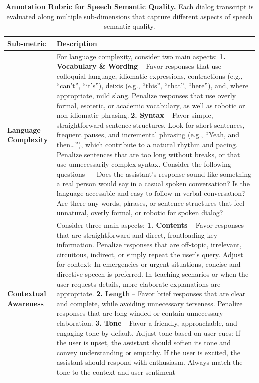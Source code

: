 \begin{table}[h]
\centering
\footnotesize
\renewcommand{\arraystretch}{1}  %
\setlength{\tabcolsep}{10pt}
\captionsetup{font=small}

\caption{\textbf{Annotation Rubric for Speech Semantic Quality.}
Each dialog transcript is evaluated along multiple sub-dimensions that capture different aspects of speech semantic quality.}
\vspace{-0.6em}

\begin{tabular}{p{4.3cm} p{11.4cm}}
\toprule
\textbf{Sub-metric} & \textbf{Description} \\
\midrule
\textbf{Language Complexity} & For language complexity, consider two main aspects: \textbf{1. Vocabulary \& Wording} -- Favor responses that use colloquial language, idiomatic expressions, contractions (e.g., “can’t”, “it’s”), deixis (e.g., “this”, “that”, “here”), and, where appropriate, mild slang. Penalize responses that use overly formal, esoteric, or academic vocabulary, as well as robotic or non-idiomatic phrasing. \textbf{2. Syntax} -- Favor simple, straightforward sentence structures. Look for short sentences, frequent pauses, and incremental phrasing (e.g., “Yeah, and then…”), which contribute to a natural rhythm and pacing. Penalize sentences that are too long without breaks, or that use unnecessarily complex syntax. Consider the following questions --- Does the assistant’s response sound like something a real person would say in a casual spoken conversation? Is the language accessible and easy to follow in verbal conversation? Are there any words, phrases, or sentence structures that feel unnatural, overly formal, or robotic for spoken dialog? \\
\textbf{Contextual Awareness} & Consider three main aspects: \textbf{1. Contents} -- Favor responses that are straightforward and direct, frontloading key information. Penalize responses that are off-topic, irrelevant, circuitous, indirect, or simply repeat the user’s query. Adjust for context: In emergencies or urgent situations, concise and directive speech is preferred. In teaching scenarios or when the user requests details, more elaborate explanations are appropriate. \textbf{2. Length} -- Favor brief responses that are clear and complete, while avoiding unnecessary terseness. Penalize responses that are long-winded or contain unnecessary elaboration. \textbf{3. Tone} -- Favor a friendly, approachable, and engaging tone by default. Adjust tone based on user cues: If the user is upset, the assistant should soften its tone and convey understanding or empathy. If the user is excited, the assistant should respond with enthusiasm. Always match the tone to the context and user sentiment \\

\end{tabular}
\end{table}
